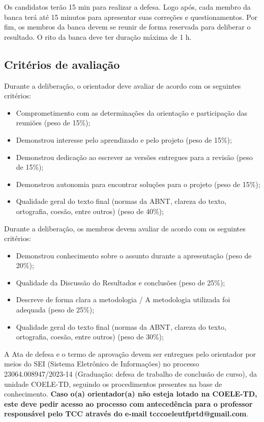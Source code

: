 \documentclass[a4paper, 12pt]{article}
\newcommand{\seiprocess}{23064.008947/2023-14} %
\begin{document}
	Os candidatos terão 15 min para realizar a defesa. Logo após, cada membro da banca terá até 15 minutos para apresentar suas correções e questionamentos. Por fim, os membros da banca devem se reunir de forma reservada para deliberar o resultado. O rito da banca deve ter duração máxima de 1 h.
	
	

	\subsection{Critérios de avaliação}

	Durante a deliberação, o orientador deve avaliar de acordo com os seguintes critérios:

	\begin{itemize}
		\item Comprometimento com as determinações da orientação e participação das reuniões (peso de 15\%);
		\item Demonstrou interesse pelo aprendizado e pelo projeto (peso de 15\%);
		\item Demonstrou dedicação ao escrever as versões entregues para a revisão (peso de 15\%);
		\item Demonstrou autonomia para encontrar soluções para o projeto (peso de 15\%);
		\item Qualidade geral do texto final (normas da ABNT, clareza do texto, ortografia, coesão, entre outros) (peso de 40\%);
	\end{itemize}

	Durante a deliberação, os membros devem avaliar de acordo com os seguintes critérios:

	\begin{itemize}
		\item Demonstrou conhecimento sobre o assunto durante a apresentação (peso de 20\%);
		\item Qualidade da Discussão do Resultados e conclusões (peso de 25\%);
		\item Descreve de forma clara a metodologia / A metodologia utilizada foi adequada (peso de 25\%);
		\item Qualidade geral do texto final (normas da ABNT, clareza do texto, ortografia, coesão, entre outros) (peso de 30\%);
	\end{itemize}

 	
	A Ata de defesa e o termo de aprovação devem ser entregues pelo orientador por meios do SEI (Sistema Eletrônico de Informações) no processo \seiprocess{} (Graduação: defesa de trabalho de conclusão de curso), da unidade COELE-TD, seguindo os procedimentos presentes na base de conhecimento. \textbf{Caso o(a) orientador(a) não esteja lotado na COELE-TD, este deve pedir acesso ao processo com antecedência para o professor responsável pelo TCC através do e-mail tcccoeleutfprtd@gmail.com}.
\end{document}
